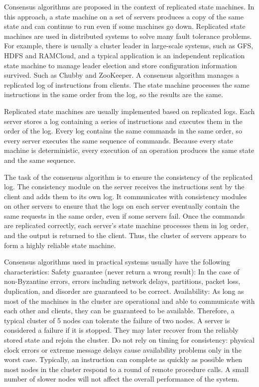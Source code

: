Consensus algorithms are proposed in the context of replicated state machines. In this approach, a state machine on a set of servers produces a copy of the same state and can continue to run even if some machines go down. Replicated state machines are used in distributed systems to solve many fault tolerance problems. For example, there is usually a cluster leader in large-scale systems, such as GFS, HDFS and RAMCloud, and a typical application is an independent replication state machine to manage leader election and store configuration information survived. Such as Chubby and ZooKeeper.
A consensus algorithm manages a replicated log of instructions from clients. The state machine processes the same instructions in the same order from the log, so the results are the same.

Replicated state machines are usually implemented based on replicated logs. Each server stores a log containing a series of instructions and executes them in the order of the log. Every log contains the same commands in the same order, so every server executes the same sequence of commands. Because every state machine is deterministic, every execution of an operation produces the same state and the same sequence.

The task of the consensus algorithm is to ensure the consistency of the replicated log. The consistency module on the server receives the instructions sent by the client and adds them to its own log. It communicates with consistency modules on other servers to ensure that the logs on each server eventually contain the same requests in the same order, even if some servers fail. Once the commands are replicated correctly, each server's state machine processes them in log order, and the output is returned to the client. Thus, the cluster of servers appears to form a highly reliable state machine.

Consensus algorithms used in practical systems usually have the following characteristics:
Safety guarantee (never return a wrong result): In the case of non-Byzantine errors, errors including network delays, partitions, packet loss, duplication, and disorder are guaranteed to be correct.
Availability: As long as most of the machines in the cluster are operational and able to communicate with each other and clients, they can be guaranteed to be available. Therefore, a typical cluster of 5 nodes can tolerate the failure of two nodes. A server is considered a failure if it is stopped. They may later recover from the reliably stored state and rejoin the cluster.
Do not rely on timing for consistency: physical clock errors or extreme message delays cause availability problems only in the worst case.
Typically, an instruction can complete as quickly as possible when most nodes in the cluster respond to a round of remote procedure calls. A small number of slower nodes will not affect the overall performance of the system.






